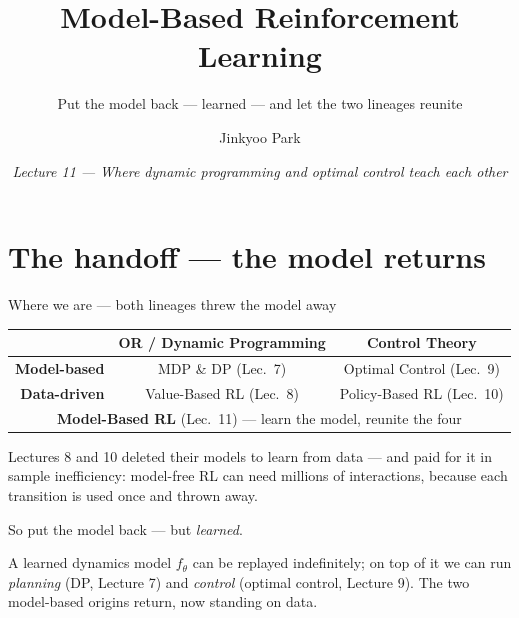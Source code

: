 \documentclass[10pt, aspectratio=169]{beamer}
\title{Model-Based Reinforcement Learning}
\subtitle{Put the model back --- learned --- and let the two lineages reunite}
\author{Jinkyoo Park}
\institute{KAIST}
\date{\textit{Lecture 11 --- Where dynamic programming and optimal control teach each other}}
\begin{document}
\maketitle

\section{The handoff --- the model returns}

\begin{frame}{Where we are --- both lineages threw the model away}
\vspace{2pt}
\begin{center}\footnotesize\renewcommand{\arraystretch}{1.35}
\begin{tabular}{r|c|c}
 & \textbf{OR / Dynamic Programming} & \textbf{Control Theory} \\
\hline
\textbf{Model-based} & MDP \& DP \scriptsize(Lec.\ 7) & Optimal Control \scriptsize(Lec.\ 9)\\
\hline
\textbf{Data-driven} & Value-Based RL \scriptsize(Lec.\ 8) & Policy-Based RL \scriptsize(Lec.\ 10)\\
\hline
\multicolumn{3}{c}{\cellcolor{mDarkTeal!15}\textbf{Model-Based RL} \scriptsize(\alert{Lec.\ 11}) --- learn the model, reunite the four}\\
\end{tabular}
\end{center}
\smallskip

Lectures 8 and 10 deleted their models to learn from data --- and paid for it in \alert{sample inefficiency}: model-free RL can need millions of interactions, because each transition is used once and thrown away.
\smallskip

\pause
\begin{center}\large
\alert{So put the model back --- but \emph{learned}.}
\end{center}
A learned dynamics model $f_\theta$ can be replayed indefinitely; on top of it we can run \emph{planning} (DP, Lecture 7) and \emph{control} (optimal control, Lecture 9). The two model-based origins return, now standing on data.
\end{frame}
\end{document}
